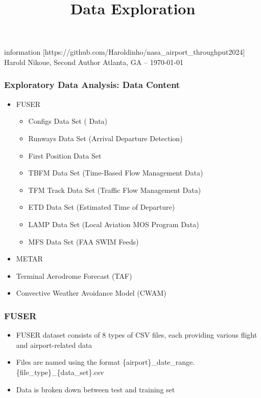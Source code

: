 \documentclass[11pt,xcolor={dvipsnames},hyperref={pdftex,pdfpagemode=UseNone,hidelinks,pdfdisplaydoctitle=true},usepdftitle=false]{beamer}
\begin{document}
\title{Data Exploration}
information
%
[https://github.com/Haroldinho/nasa\_airport\_throughput2024]
%
{Harold Nikoue, Second Author}
%
{Atlanta, GA -- \today}

\frame{\titlepage}

\begin{frame}
\frametitle{Exploratory Data Analysis: Data Content}
\begin{itemize}
	\item FUSER
	\begin{itemize}
		\item Configs Data Set ( Data)
		\item Runways Data Set (Arrival Departure Detection)
		\item First Position Data Set
		\item TBFM Data Set (Time-Based Flow Management Data)
		\item TFM Track Data Set (Traffic Flow Management Data)
		\item ETD Data Set (Estimated Time of Departure)
		\item LAMP Data Set (Local Aviation MOS Program Data)
		\item MFS Data Set (FAA SWIM Feeds)
	\end{itemize}
	\item METAR
	\item Terminal Aerodrome Forecast (TAF)
	\item Convective Weather Avoidance Model (CWAM)
\end{itemize}
\end{frame}

\begin{frame}
\frametitle{FUSER}
\begin{itemize}
	\item FUSER dataset consists of 8 types of CSV files, each providing various flight and airport-related data
	\item Files are named using the format \{airport\}\_date\_range.\{file\_type\}\_\{data\_set\}.csv
	\item Data is broken down between test and training set
	
\end{itemize}
\end{frame}
\end{document}
